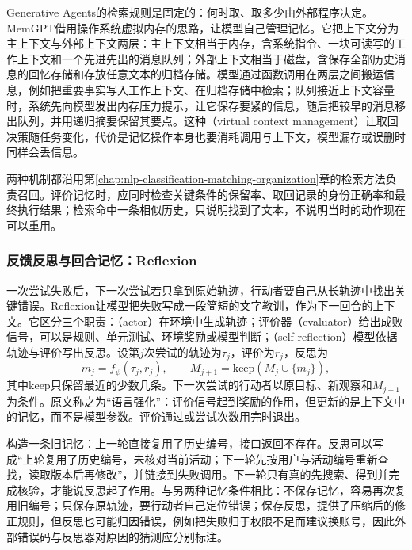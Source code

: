 Generative Agents的检索规则是固定的：何时取、取多少由外部程序决定。MemGPT借用操作系统虚拟内存的思路，让模型自己管理记忆。它把上下文分为主上下文与外部上下文两层：主上下文相当于内存，含系统指令、一块可读写的工作上下文和一个先进先出的消息队列；外部上下文相当于磁盘，含保存全部历史消息的回忆存储和存放任意文本的归档存储。模型通过函数调用在两层之间搬运信息，例如把重要事实写入工作上下文、在归档存储中检索；队列接近上下文容量时，系统先向模型发出内存压力提示，让它保存要紧的信息，随后把较早的消息移出队列，并用递归摘要保留其要点。这种（virtual context management）让取回决策随任务变化，代价是记忆操作本身也要消耗调用与上下文，模型漏存或误删时同样会丢信息。

两种机制都沿用第\ref{chap:nlp-classification-matching-organization}章的检索方法负责召回。评价记忆时，应同时检查关键条件的保留率、取回记录的身份正确率和最终执行结果；检索命中一条相似历史，只说明找到了文本，不说明当时的动作现在可以重用。

\subsubsection{反馈反思与回合记忆：Reflexion}
\label{sec:nlp-execution-reflexion}

一次尝试失败后，下一次尝试若只拿到原始轨迹，行动者要自己从长轨迹中找出关键错误。Reflexion让模型把失败写成一段简短的文字教训，作为下一回合的上下文。它区分三个职责：（actor）在环境中生成轨迹；评价器（evaluator）给出成败信号，可以是规则、单元测试、环境奖励或模型判断；（self-reflection）模型依据轨迹与评价写出反思。设第$j$次尝试的轨迹为$\tau_j$，评价为$r_j$，反思为
\[
 m_j=f_{\psi}(\tau_j,r_j),\qquad M_{j+1}=\mathrm{keep}(M_j\cup\{m_j\}),
\]
其中$\mathrm{keep}$只保留最近的少数几条。下一次尝试的行动者以原目标、新观察和$M_{j+1}$为条件。原文称之为“语言强化”：评价信号起到奖励的作用，但更新的是上下文中的记忆，而不是模型参数。评价通过或尝试次数用完时退出。

构造一条旧记忆：上一轮直接复用了历史编号，接口返回不存在。反思可以写成“上轮复用了历史编号，未核对当前活动；下一轮先按用户与活动编号重新查找，读取版本后再修改”，并链接到失败调用。下一轮只有真的先搜索、得到并完成核验，才能说反思起了作用。与另两种记忆条件相比：不保存记忆，容易再次复用旧编号；只保存原轨迹，要行动者自己定位错误；保存反思，提供了压缩后的修正规则，但反思也可能归因错误，例如把失败归于权限不足而建议换账号，因此外部错误码与反思器对原因的猜测应分别标注。

